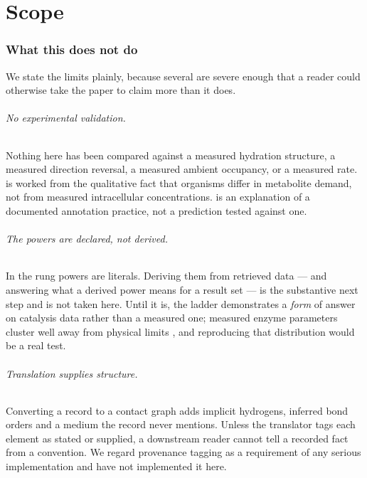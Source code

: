 \documentclass[11pt,twocolumn,a4paper]{article}
\theoremstyle{thmstyle}
\theoremstyle{definition}
\theoremstyle{remark}
\begin{document}
\part{Scope}

\section{What this does not do}
\label{sec:limits}

We state the limits plainly, because several are severe enough that a reader
could otherwise take the paper to claim more than it does.

\paragraph{No experimental validation.} Nothing here has been compared against
a measured hydration structure, a measured direction reversal, a measured
ambient occupancy, or a measured rate.  is worked from
the qualitative fact that organisms differ in metabolite demand, not from
measured intracellular concentrations.  is an
explanation of a documented annotation practice, not a prediction tested
against one.

\paragraph{The powers are declared, not derived.} In
 the rung powers are literals. Deriving them
from retrieved data --- and answering what a derived power means for a result
set --- is the substantive next step and is not taken here. Until it is, the
ladder demonstrates a \emph{form} of answer on catalysis data rather than a
measured one; measured enzyme parameters cluster well away from physical
limits \citep{barevenn2011}, and reproducing that distribution would be a
real test.

\paragraph{Translation supplies structure.} Converting a record to a contact
graph adds implicit hydrogens, inferred bond orders and a medium the record
never mentions. Unless the translator tags each element as stated or supplied,
a downstream reader cannot tell a recorded fact from a convention. We regard
provenance tagging as a requirement of any serious implementation and have not
implemented it here.
\end{document}
